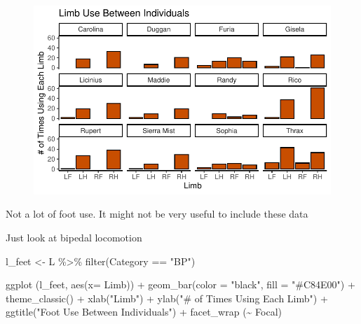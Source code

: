 \documentclass[
  letterpaper,
  DIV=11,
  numbers=noendperiod]{scrartcl}
\newenvironment{Shaded}{\begin{snugshade}}{\end{snugshade}}
\newcommand{\AttributeTok}[1]{\textcolor[rgb]{0.40,0.45,0.13}{#1}}
\newcommand{\FunctionTok}[1]{\textcolor[rgb]{0.28,0.35,0.67}{#1}}
\newcommand{\NormalTok}[1]{\textcolor[rgb]{0.00,0.23,0.31}{#1}}
\newcommand{\OtherTok}[1]{\textcolor[rgb]{0.00,0.23,0.31}{#1}}
\newcommand{\SpecialCharTok}[1]{\textcolor[rgb]{0.37,0.37,0.37}{#1}}
\newcommand{\StringTok}[1]{\textcolor[rgb]{0.13,0.47,0.30}{#1}}
\begin{document}
\begin{figure}[H]

{\centering \includegraphics{LeftyLemurs_files/figure-pdf/unnamed-chunk-43-1.pdf}

}

\end{figure}

Not a lot of foot use. It might not be very useful to include these data

Just look at bipedal locomotion

\begin{Shaded}
\begin{Highlighting}[]
\NormalTok{l\_feet }\OtherTok{\textless{}{-}} 
\NormalTok{L }\SpecialCharTok{\%\textgreater{}\%} 
  \FunctionTok{filter}\NormalTok{(Category }\SpecialCharTok{==} \StringTok{"BP"}\NormalTok{)}

\FunctionTok{ggplot}\NormalTok{ (l\_feet, }\FunctionTok{aes}\NormalTok{(}\AttributeTok{x=}\NormalTok{ Limb)) }\SpecialCharTok{+}
  \FunctionTok{geom\_bar}\NormalTok{(}\AttributeTok{color =} \StringTok{"black"}\NormalTok{, }\AttributeTok{fill =} \StringTok{"\#C84E00"}\NormalTok{) }\SpecialCharTok{+}
  \FunctionTok{theme\_classic}\NormalTok{() }\SpecialCharTok{+}
  \FunctionTok{xlab}\NormalTok{(}\StringTok{"Limb"}\NormalTok{) }\SpecialCharTok{+}
  \FunctionTok{ylab}\NormalTok{(}\StringTok{"\# of Times Using Each Limb"}\NormalTok{) }\SpecialCharTok{+}
  \FunctionTok{ggtitle}\NormalTok{(}\StringTok{"Foot Use Between Individuals"}\NormalTok{) }\SpecialCharTok{+}
  \FunctionTok{facet\_wrap}\NormalTok{ (}\SpecialCharTok{\textasciitilde{}}\NormalTok{ Focal)}
\end{Highlighting}
\end{Shaded}
\end{document}
